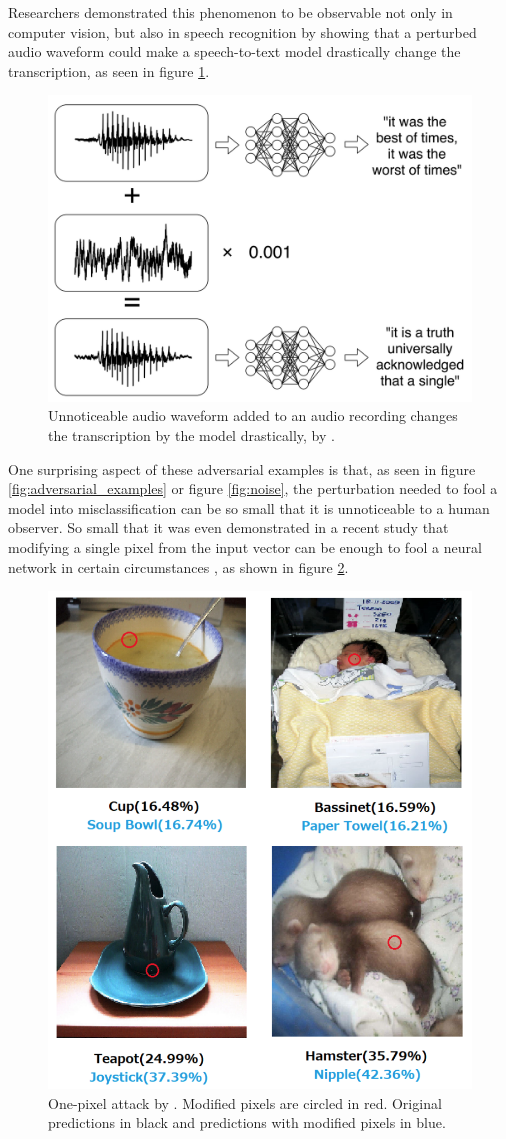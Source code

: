 Researchers demonstrated this phenomenon to be observable not only in computer
vision, but also in speech recognition \cite{carlini_audio_2018} by showing that
a perturbed audio waveform could make a speech-to-text model drastically change
the transcription, as seen in figure \ref{fig:carlini_audio}.
\begin{figure}[!htb]
    \centering
    \includegraphics[width=.6\linewidth]{Figures/intro/carlini_noise.png}
    \caption{ Unnoticeable audio waveform added to an audio recording changes
        the transcription by the model drastically, by
        \cite{carlini_audio_2018}.}
    \label{fig:carlini_audio}
\end{figure}



One surprising aspect of these adversarial examples is that, as seen in figure
\ref{fig:adversarial_examples} or figure \ref{fig:noise}, the perturbation
needed to fool a model into misclassification can be so small that it is
unnoticeable to a human observer. So small that it was even demonstrated in a
recent study that modifying a single pixel from the input vector can be enough
to fool a neural network in certain circumstances \cite{su_one_2019}, as shown in figure
\ref{fig:su_one_pixel}.

\begin{figure}[!htb]
    \centering
    \includegraphics[width=.6\linewidth]{Figures/intro/su_one_pixel.png}
    \caption{ One-pixel attack by \cite{su_one_2019}. Modified pixels are
        circled in red. Original predictions in black and predictions with
        modified pixels in blue.}
    \label{fig:su_one_pixel}
\end{figure}

